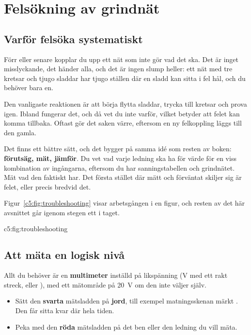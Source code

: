 %

\section{Felsökning av grindnät}
\label{c5:app:a}

\subsection{Varför felsöka systematiskt}
\label{c5:a1}
Förr eller senare kopplar du upp ett nät som inte gör vad det ska. Det är inget misslyckande, det
händer alla, och det är ingen slump heller: ett nät med tre kretsar och tjugo sladdar har tjugo
ställen där en sladd kan sitta i fel hål, och du behöver bara en.

Den vanligaste reaktionen är att börja flytta sladdar, trycka till kretsar och prova igen. Ibland
fungerar det, och då vet du inte varför, vilket betyder att felet kan komma tillbaka. Oftast gör
det saken värre, eftersom en ny felkoppling läggs till den gamla.

Det finns ett bättre sätt, och det bygger på samma idé som resten av boken: \textbf{förutsäg, mät,
jämför}. Du vet vad varje ledning ska ha för värde för en viss kombination av ingångarna, eftersom
du har sanningstabellen och grindnätet. Mät vad den faktiskt har. Det första stället där mätt och
förväntat skiljer sig är felet, eller precis bredvid det.

Figur~\ref{c5:fig:troubleshooting} visar arbetsgången i en figur, och resten av det här avsnittet
går igenom stegen ett i taget.

  {c5:fig:troubleshooting}

\subsection{Att mäta en logisk nivå}
\label{c5:a2}
Allt du behöver är en \textbf{multimeter} inställd på likspänning (V med ett rakt streck, eller
), med ett mätområde på 20~V om den inte väljer själv.
\begin{itemize}
  \item Sätt den \textbf{svarta} mätsladden på \textbf{jord}, till exempel matningsskenan märkt
    \code{-}. Den får sitta kvar där hela tiden.
  \item Peka med den \textbf{röda} mätsladden på det ben eller den ledning du vill mäta.
\end{itemize}

